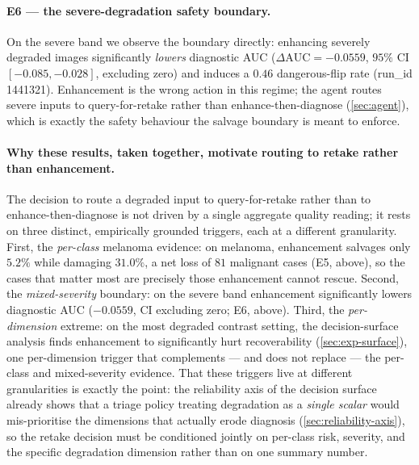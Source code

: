 
\paragraph{E6 --- the severe-degradation safety boundary.}
On the severe band we observe the boundary directly: enhancing severely degraded images
significantly \emph{lowers} diagnostic AUC ($\Delta\mathrm{AUC}=-0.0559$, $95\%$ CI
$[-0.085,-0.028]$, excluding zero) and induces a $0.46$ dangerous-flip rate (run\_id 1441321).
Enhancement is the wrong action in this regime; the agent routes severe inputs to query-for-retake
rather than enhance-then-diagnose (\cref{sec:agent}), which is exactly the safety behaviour the
salvage boundary is meant to enforce.

\paragraph{Why these results, taken together, motivate routing to retake rather than enhancement.}
The decision to route a degraded input to query-for-retake rather than to enhance-then-diagnose is
not driven by a single aggregate quality reading; it rests on three distinct, empirically grounded
triggers, each at a different granularity. First, the \emph{per-class} melanoma evidence: on
melanoma, enhancement salvages only $5.2\%$ while damaging $31.0\%$, a net loss of $81$ malignant
cases (E5, above), so the cases that matter most are precisely those enhancement cannot rescue.
Second, the \emph{mixed-severity} boundary: on the severe band enhancement significantly lowers
diagnostic AUC ($-0.0559$, CI excluding zero; E6, above). Third, the \emph{per-dimension} extreme:
on the most degraded contrast setting, the decision-surface analysis finds enhancement to
significantly hurt recoverability (\cref{sec:exp-surface}), one per-dimension trigger that
complements --- and does not replace --- the per-class and mixed-severity evidence. That these
triggers live at different granularities is exactly the point: the reliability axis of the
decision surface already shows that a triage policy treating degradation as a \emph{single scalar}
would mis-prioritise the dimensions that actually erode diagnosis (\cref{sec:reliability-axis}), so
the retake decision must be conditioned jointly on per-class risk, severity, and the specific
degradation dimension rather than on one summary number.


